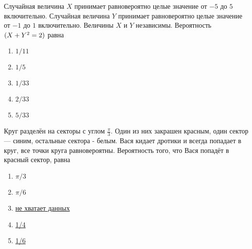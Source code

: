 \documentclass[t]{beamer}
\let\P\relax
\DeclareMathOperator{\P}{\mathbb{P}}
\begin{document}
 \begin{frame} \label{8} 
\begin{block}{8} 

  Случайная величина $X$ принимает равновероятно целые значение от $-5$ до $5$ включительно. Случайная величина $Y$ принимает равновероятно целые значение от $-1$ до $1$ включительно. Величины $X$ и $Y$ независимы. Вероятность $\P(X+Y^2=2)$ равна
  


 \end{block} 
\begin{enumerate} 
\item[] \hyperlink{8-Yes}{\beamergotobutton{} $1/11$}
\item[] \hyperlink{8-No}{\beamergotobutton{} $1/5$}
\item[] \hyperlink{8-No}{\beamergotobutton{} $1/33$}
\item[] \hyperlink{8-No}{\beamergotobutton{} $2/33$}
\item[] \hyperlink{8-No}{\beamergotobutton{} $5/33$}
\end{enumerate} 
\end{frame} 


 \begin{frame} \label{9} 
\begin{block}{9} 

Круг разделён на секторы с углом $\frac{\pi}{3}$. Один из них закрашен красным, один сектор — синим, остальные сектора - белым. Вася кидает дротики и всегда попадает в круг, все точки круга равновероятны. Вероятность того, что Вася попадёт в красный сектор, равна


 \end{block} 
\begin{enumerate} 
\item[] \hyperlink{9-No}{\beamergotobutton{} $\pi / 3$}
\item[] \hyperlink{9-No}{\beamergotobutton{} $\pi / 6$}
\item[] \hyperlink{9-No}{\beamergotobutton{} не хватает данных}
\item[] \hyperlink{9-No}{\beamergotobutton{} 1/4}
\item[] \hyperlink{9-Yes}{\beamergotobutton{} 1/6}
\end{enumerate} 
\end{frame} 
\end{document}
